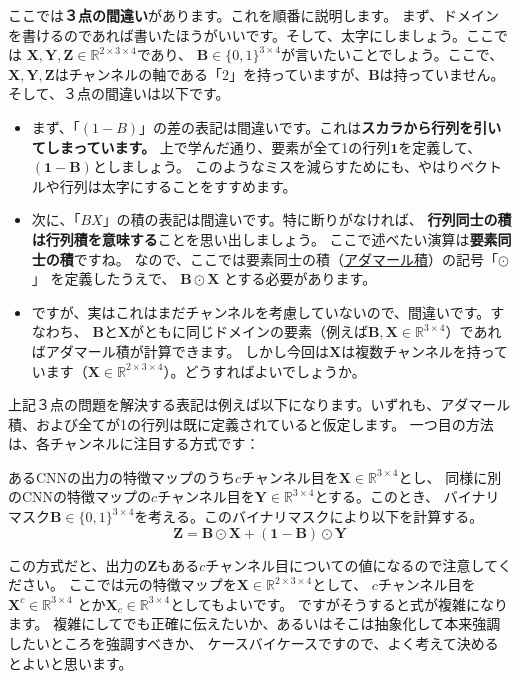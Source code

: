 \documentclass[uplatex,twocolumn,9pt,dvipdfmx]{jsarticle}
\begin{document}
ここでは\textbf{３点の間違い}があります。これを順番に説明します。
まず、ドメインを書けるのであれば書いたほうがいいです。そして、太字にしましょう。ここでは
$\mathbf{X}, \mathbf{Y}, \mathbf{Z} \in \mathbb{R}^{2 \times 3 \times 4}$であり、
$\mathbf{B} \in \{0, 1\}^{3 \times 4}$が言いたいことでしょう。ここで、
$\mathbf{X}, \mathbf{Y}, \mathbf{Z}$はチャンネルの軸である「$2$」を持っていますが、$\mathbf{B}$は持っていません。
そして、３点の間違いは以下です。
\begin{itemize}
\item まず、「$(1-B)$」の差の表記は間違いです。これは\textbf{スカラから行列を引いてしまっています。}
上で学んだ通り、要素が全て1の行列$\mathbf{1}$を定義して、$(\mathbf{1} - \mathbf{B})$としましょう。
このようなミスを減らすためにも、やはりベクトルや行列は太字にすることをすすめます。
\item 次に、「$BX$」の積の表記は間違いです。特に断りがなければ、
\textbf{行列同士の積は行列積を意味する}ことを思い出しましょう。
ここで述べたい演算は\textbf{要素同士の積}ですね。
なので、ここでは要素同士の積（\href{https://en.wikipedia.org/wiki/Hadamard_product_(matrices)}{アダマール積}）の記号「$\odot$」
を定義したうえで、
$\mathbf{B} \odot \mathbf{X}$
とする必要があります。
\item ですが、実はこれはまだチャンネルを考慮していないので、間違いです。すなわち、
$\mathbf{B}$と$\mathbf{X}$がともに同じドメインの要素（例えば$\mathbf{B}, \mathbf{X} \in \mathbb{R}^{3\times 4}$）であればアダマール積が計算できます。
しかし今回は$\mathbf{X}$は複数チャンネルを持っています（$\mathbf{X} \in \mathbb{R}^{2\times3\times4}$）。どうすればよいでしょうか。
\end{itemize}

上記３点の問題を解決する表記は例えば以下になります。いずれも、アダマール積、および全てが1の行列は既に定義されていると仮定します。
一つ目の方法は、各チャンネルに注目する方式です：
\begin{screen}
あるCNNの出力の特徴マップのうち$c$チャンネル目を$\mathbf{X}\in\mathbb{R}^{3 \times4}$とし、
同様に別のCNNの特徴マップの$c$チャンネル目を$\mathbf{Y} \in \mathbb{R}^{3 \times4}$とする。このとき、
バイナリマスク$\mathbf{B}\in\{0, 1\}^{3\times 4}$を考える。このバイナリマスクにより以下を計算する。
\begin{equation}
    \mathbf{Z} = \mathbf{B} \odot \mathbf{X} + (\mathbf{1} - \mathbf{B}) \odot \mathbf{Y}
\end{equation}
\end{screen}
この方式だと、出力の$\mathbf{Z}$もある$c$チャンネル目についての値になるので注意してください。
ここでは元の特徴マップを$\mathbf{X} \in \mathbb{R}^{2\times 3 \times 4}$として、
$c$チャンネル目を$\mathbf{X}^c \in \mathbb{R}^{3 \times 4}$
とか$\mathbf{X}_c \in \mathbb{R}^{3 \times 4}$としてもよいです。
ですがそうすると式が複雑になります。
複雑にしてでも正確に伝えたいか、あるいはそこは抽象化して本来強調したいところを強調すべきか、
ケースバイケースですので、よく考えて決めるとよいと思います。
\end{document}
